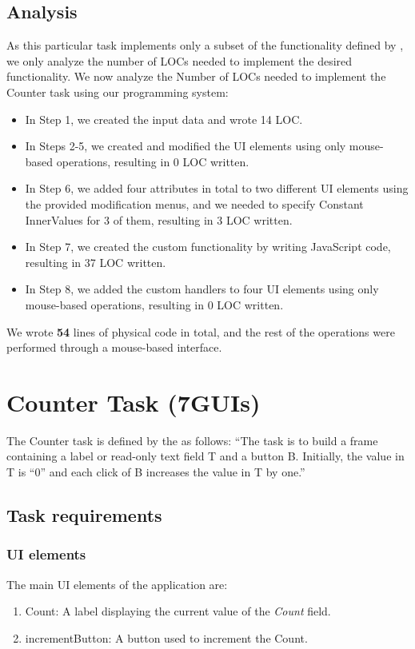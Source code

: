 \medskip
\subsection{Analysis}
As this particular task implements only a subset of the functionality defined by \citet{todo-spec}, we only analyze the number of LOCs needed to implement the desired functionality.
We now analyze the Number of LOCs needed to implement the Counter task using our programming system:
\begin{itemize}
	\item In Step 1, we created the input data and wrote 14 LOC.
	\item   In Steps 2-5, we created and modified the UI elements using only mouse-based operations, resulting in 0 LOC written.
	\item   In Step 6, we added four attributes in total to two different UI elements using the provided modification menus, and we needed to specify Constant InnerValues for 3 of them, resulting in 3 LOC written.
	\item   In Step 7, we created the custom functionality by writing JavaScript code, resulting in 37 LOC written.
	\item In Step 8, we added the custom handlers to four UI elements using only mouse-based operations, resulting in 0 LOC written.
\end{itemize}
\noindent We wrote \textbf{54} lines of physical code in total, and the rest of the operations were performed through a mouse-based interface.





\clearpage
\section{Counter Task (7GUIs)}
The Counter task is defined by the \citet{7GUIs-web} as follows: ``The task is to build a frame containing a label or read-only text field T and a button B. Initially, the value in T is “0” and each click of B increases the value in T by one.''

\subsection{Task requirements}
\subsubsection{UI elements}
The main UI elements of the application are:
\begin{enumerate}
	\item Count: A label displaying the current value of the \emph{Count} field.
	\item incrementButton: A button used to increment the Count.
\end{enumerate}


